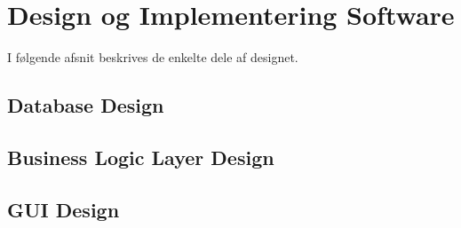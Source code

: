 \section{Design og Implementering Software}
I følgende afsnit beskrives de enkelte dele af designet.

\subsection{Database Design}


\subsection{Business Logic Layer Design}


\subsection{GUI Design}
